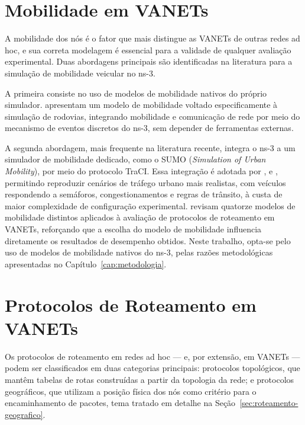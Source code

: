 \section{Mobilidade em VANETs}
\label{sec:mobilidade}

A mobilidade dos nós é o fator que mais distingue as VANETs de outras redes ad hoc, e sua
correta modelagem é essencial para a validade de qualquer avaliação experimental. Duas
abordagens principais são identificadas na literatura para a simulação de mobilidade
veicular no ns-3.

A primeira consiste no uso de modelos de mobilidade nativos do próprio simulador.
 apresentam um modelo de mobilidade voltado especificamente à
simulação de rodovias, integrando mobilidade e comunicação de rede por meio do mecanismo de
eventos discretos do ns-3, sem depender de ferramentas externas.

A segunda abordagem, mais frequente na literatura recente, integra o ns-3 a um simulador de
mobilidade dedicado, como o SUMO (\textit{Simulation of Urban Mobility}), por meio do
protocolo TraCI. Essa integração é adotada por ,
 e , permitindo reproduzir cenários
de tráfego urbano mais realistas, com veículos respondendo a semáforos, congestionamentos e
regras de trânsito, à custa de maior complexidade de configuração experimental.
 revisam quatorze modelos de mobilidade distintos aplicados à
avaliação de protocolos de roteamento em VANETs, reforçando que a escolha do modelo de
mobilidade influencia diretamente os resultados de desempenho obtidos. Neste trabalho, opta-se
pelo uso de modelos de mobilidade nativos do ns-3, pelas razões metodológicas apresentadas no
Capítulo~\ref{cap:metodologia}.

\section{Protocolos de Roteamento em VANETs}
\label{sec:protocolos-roteamento}

Os protocolos de roteamento em redes ad hoc — e, por extensão, em VANETs — podem ser
classificados em duas categorias principais: protocolos topológicos, que mantêm tabelas de
rotas construídas a partir da topologia da rede; e protocolos geográficos, que utilizam a
posição física dos nós como critério para o encaminhamento de pacotes, tema tratado em
detalhe na Seção~\ref{sec:roteamento-geografico}.

